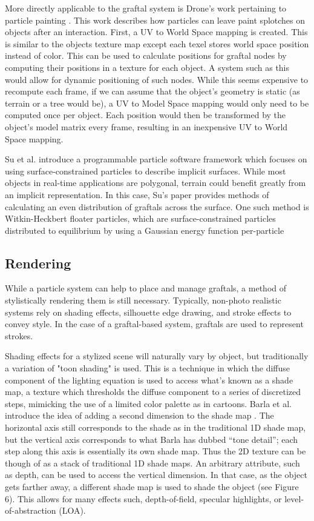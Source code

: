\documentclass[notitlepage]{report}
\begin{document}
More directly applicable to the graftal system is Drone's work pertaining to particle painting \cite{Drone2007}. This work describes how particles can leave paint splotches on objects after an interaction. First, a UV to World Space mapping is created. This is similar to the objects texture map except each texel stores world space position instead of color. This can be used to calculate positions for graftal nodes by computing their positions in a texture for each object. A system such as this would allow for dynamic positioning of such nodes. While this seems expensive to recompute each frame, if we can assume that the object’s geometry is static (as terrain or a tree would be), a UV to Model Space mapping would only need to be computed once per object. Each position would then be transformed by the object’s model matrix every frame, resulting in an inexpensive UV to World Space mapping.

Su et al. introduce a programmable particle software framework \cite{Su2005} which focuses on using surface-constrained particles to describe implicit surfaces. While most objects in real-time applications are polygonal, terrain could benefit greatly from an implicit representation. In this case, Su's paper provides methods of calculating an even distribution of graftals across the surface. One such method is Witkin-Heckbert floater particles, which are surface-constrained particles distributed to equilibrium by using a Gaussian energy function per-particle

\subsection{Rendering}
While a particle system can help to place and manage graftals, a method of stylistically rendering them is still necessary. Typically, non-photo realistic systems rely on shading effects, silhouette edge drawing, and stroke effects to convey style. In the case of a graftal-based system, graftals are used to represent strokes. 

Shading effects for a stylized scene will naturally vary by object, but traditionally a variation of "toon shading" is used. This is a technique in which the diffuse component of the lighting equation is used to access what's known as a shade map, a texture which thresholds the diffuse component to a series of discretized steps, mimicking the use of a limited color palette as in cartoons. Barla et al. introduce the idea of adding a second dimension to the shade map \cite{Barla2006}. The horizontal axis still corresponds to the shade as in the traditional 1D shade map, but the vertical axis corresponds to what Barla has dubbed “tone detail”; each step along this axis is essentially its own shade map. Thus the 2D texture can be though of as a stack of traditional 1D shade maps. An arbitrary attribute, such as depth, can be used to access the vertical dimension. In that case, as the object gets farther away, a different shade map is used to shade the object (see Figure 6). This allows for many effects such, depth-of-field, specular highlights, or level-of-abstraction (LOA).
\end{document}
